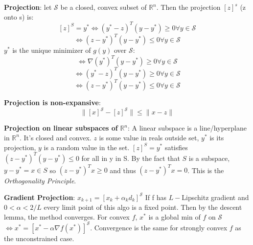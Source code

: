 \documentclass[10pt,landscape]{article}
\begin{document}
\begin{multicols*}{\mycolnums}
    \noindent
    \textbf{Projection}: let $\mathcal{S}$ be a closed, convex subset of $\mathbb{R}^n$. Then
    the projection $[z]^s$ (z onto s) is:
    \[[z]^S=y^* \iff (y^*-z)^T(y-y^*)\geq 0\forall y\in\mathcal{S}\]
    \[\iff (z-y^*)^T(y-y^*)\leq 0\forall y\in\mathcal{S}\]
    $y^*$ is the unique minimizer of $g(y)$ over $\mathcal{S}$:
    \[\iff \nabla(y^*)^T(y-y^*)\geq 0\forall y\in\mathcal{S}\]
    \[\iff (y^*-z)^T(y-y^*)\geq 0\forall y\in\mathcal{S}\]
    \[\iff (z-y^*)^T(y-y^*)\leq 0\forall y\in\mathcal{S}\]

    \textbf{Projection is non-expansive}:
    \[\|[x]^\mathcal{S}-[z]^\mathcal{S}\|\leq\|x-z\|\]

    \textbf{Projection on linear subspaces of} $\mathbb{R}^n$:
    A linear subspace is a line/hyperplane in $\mathbb{R}^n$. It's closed and convex.
    $z$ is some value in reals outside set, $y^*$ is its projection, $y$ is a random value in the set.
    $[z]^S=y^*$ satisfies $(z-y^*)^T(y-y^*)\leq 0$ for all in y in S. By the fact that $S$ is a subspace,
    $y-y^*=x\in S$ so $(z-y^*)^Tx\geq 0$ and thus $(z-y^*)^Tx=0$.
    This is the \textit{Orthogonality Principle}.

    \noindent
    \textbf{Gradient Projection}:
    $x_{k+1}=[x_k+\alpha_kd_k]^\mathcal{S}$
    If f has $L-$Lipschitz gradient and $0<\alpha<2/L$ every limit point of this algo
    is a fixed point. Then by the descent lemma, the method converges. For convex $f$, $x^*$
    is a global min of $f$ on $\mathcal{S}$ $\iff x^*=[x^*-\alpha\nabla f(x^*)]^\mathcal{S}$.
    Convergence is the same for strongly convex $f$ as the unconstrained case.

\end{multicols*}
\end{document}
